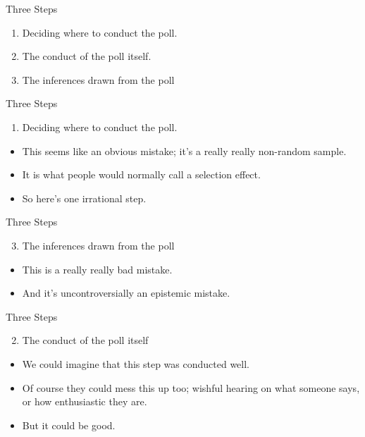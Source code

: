 \documentclass[
  17pt,
  letterpaper,
  ignorenonframetext,
  aspectratio=169,
  handout,
  xcolor={dvipsnames}]{beamer}
\providecommand{\tightlist}{%
  \setlength{\itemsep}{0pt}\setlength{\parskip}{0pt}}\usepackage{longtable,booktabs,array}
\begin{document}
\begin{frame}{Three Steps}
\protect\hypertarget{three-steps}{}
\begin{enumerate}[<+->]
\tightlist
\item
  Deciding where to conduct the poll.
\item
  The conduct of the poll itself.
\item
  The inferences drawn from the poll
\end{enumerate}
\end{frame}

\begin{frame}{Three Steps}
\protect\hypertarget{three-steps-1}{}
\begin{enumerate}[<+->]
\tightlist
\item
  Deciding where to conduct the poll.
\end{enumerate}

\begin{itemize}[<+->]
\tightlist
\item
  This seems like an obvious mistake; it's a really really non-random
  sample.
\item
  It is what people would normally call a selection effect.
\item
  So here's one irrational step.
\end{itemize}
\end{frame}

\begin{frame}{Three Steps}
\protect\hypertarget{three-steps-2}{}
\begin{enumerate}[<+->]
\setcounter{enumi}{2}
\tightlist
\item
  The inferences drawn from the poll
\end{enumerate}

\begin{itemize}[<+->]
\tightlist
\item
  This is a really really bad mistake.
\item
  And it's uncontroversially an epistemic mistake.
\end{itemize}
\end{frame}

\begin{frame}{Three Steps}
\protect\hypertarget{three-steps-3}{}
\begin{enumerate}[<+->]
\setcounter{enumi}{1}
\tightlist
\item
  The conduct of the poll itself
\end{enumerate}

\begin{itemize}[<+->]
\tightlist
\item
  We could imagine that this step was conducted well.
\item
  Of course they could mess this up too; wishful hearing on what someone
  says, or how enthusiastic they are.
\item
  But it could be good.
\end{itemize}
\end{frame}
\end{document}
